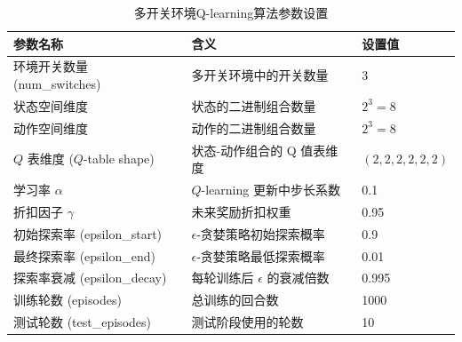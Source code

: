 \begin{table}[htbp]
\centering
\caption{多开关环境Q-learning算法参数设置}
\label{tab:multi-switch-params}
\begin{tabular}{@{}lll@{}}
\toprule
\textbf{参数名称} & \textbf{含义} & \textbf{设置值} \\
\midrule
环境开关数量 (num\_switches) & 多开关环境中的开关数量 & 3 \\
状态空间维度 & 状态的二进制组合数量 & \( 2^3 = 8 \) \\
动作空间维度 & 动作的二进制组合数量 & \( 2^3 = 8 \) \\
\(Q\) 表维度 (\(Q\)-table shape) & 状态-动作组合的 Q 值表维度 & \( (2, 2, 2, 2, 2, 2) \) \\
学习率 \(\alpha\) & \(Q\)-learning 更新中步长系数 & 0.1 \\
折扣因子 \(\gamma\) & 未来奖励折扣权重 & 0.95 \\
初始探索率 (epsilon\_start) & \(\epsilon\)-贪婪策略初始探索概率 & 0.9 \\
最终探索率 (epsilon\_end) & \(\epsilon\)-贪婪策略最低探索概率 & 0.01 \\
探索率衰减 (epsilon\_decay) & 每轮训练后 \(\epsilon\) 的衰减倍数 & 0.995 \\
训练轮数 (episodes) & 总训练的回合数 & 1000 \\
测试轮数 (test\_episodes) & 测试阶段使用的轮数 & 10 \\
\bottomrule
\end{tabular}
\end{table}